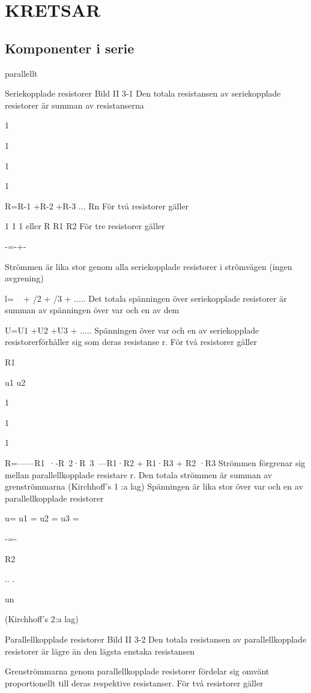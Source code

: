 \chapter{KRETSAR}

\section{Komponenter i serie}

parallellt

Seriekopplade resistorer
Bild II 3-1
Den totala resistansen av seriekopplade
resistorer är summan av resistanserna

1

1

1

1

R=R-1 +R-2 +R-3 ... Rn
För två resistorer gäller

1
1
1
eller
R R1 R2
För tre resistorer gäller

-=-+-

Strömmen är lika stor genom alla seriekopplade resistorer i strömvägen (ingen avgrening)

l= ~ + /2 + /3 + .....
Det totala spänningen över seriekopplade
resistorer är summan av spänningen över
var och en av dem

U=U1 +U2 +U3 + .....
Spänningen över var och en av seriekopplade
resistorerförhåller sig som deras resistanse r.
För två resistorer gäller

R1

u1
u2

1

1

1

R=------R1~·-R~2·R~3~---R1·R2 + R1·R3 + R2 ·R3
Strömmen förgrenar sig mellan parallellkopplade resistare r. Den totala strömmen är
summan av grenströmmarna
(Kirchhoff's 1 :a lag)
Spänningen är lika stor över var och en av
parallellkopplade resistorer

u= u1 = u2 = u3 =

-=-

R2

.. .

un

(Kirchhoff's 2:a lag)

Parallellkopplade resistorer
Bild II 3-2
Den totala resistansen av parallellkopplade
resistorer är lägre än den lägsta enstaka
resistansen

Grenströmmarna genom parallellkopplade
resistorer fördelar sig omvänt proportionellt
till deras respektive resistanser.
För två resistorer gäller


